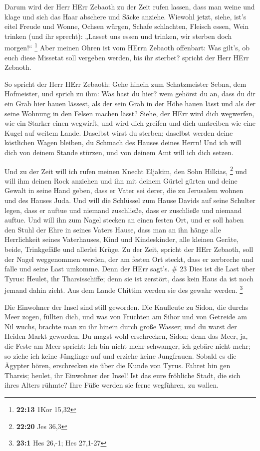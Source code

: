  Darum wird der Herr HErr Zebaoth zu der Zeit rufen lassen,
dass man weine und klage und sich das Haar abschere und Säcke anziehe.
 Wiewohl jetzt, siehe, ist's eitel Freude und Wonne, Ochsen
würgen, Schafe schlachten, Fleisch essen, Wein trinken (und ihr
sprecht): „Lasset uns essen und trinken, wir sterben doch morgen!{}``
\footnote{\textbf{22:13} 1Kor 15,32}  Aber meinen Ohren ist
vom HErrn Zebaoth offenbart: Was gilt's, ob euch diese Missetat soll
vergeben werden, bis ihr sterbet? spricht der Herr HErr Zebaoth.

 So spricht der Herr HErr Zebaoth: Gehe hinein zum
Schatzmeister Sebna, dem Hofmeister, und sprich zu ihm: 
Was hast du hier? wem gehörst du an, dass du dir ein Grab hier hauen
lässest, als der sein Grab in der Höhe hauen lässt und als der seine
Wohnung in den Felsen machen lässt?  Siehe, der HErr wird
dich wegwerfen, wie ein Starker einen wegwirft, und wird dich greifen
 und dich umtreiben wie eine Kugel auf weitem Lande.
Daselbst wirst du sterben; daselbst werden deine köstlichen Wagen
bleiben, du Schmach des Hauses deines Herrn!  Und ich will
dich von deinem Stande stürzen, und von deinem Amt will ich dich setzen.

 Und zu der Zeit will ich rufen meinen Knecht Eljakim, den
Sohn Hilkias, \footnote{\textbf{22:20} Jes 36,3}  und will
ihm deinen Rock anziehen und ihn mit deinem Gürtel gürten und deine
Gewalt in seine Hand geben, dass er Vater sei derer, die zu Jerusalem
wohnen und des Hauses Juda.  Und will die Schlüssel zum
Hause Davids auf seine Schulter legen, dass er auftue und niemand
zuschließe, dass er zuschließe und niemand auftue.  Und
will ihn zum Nagel stecken an einen festen Ort, und er soll haben den
Stuhl der Ehre in seines Vaters Hause,  dass man an ihn
hänge alle Herrlichkeit seines Vaterhauses, Kind und Kindeskinder, alle
kleinen Geräte, beide, Trinkgefäße und allerlei Krüge.  Zu
der Zeit, spricht der HErr Zebaoth, soll der Nagel weggenommen werden,
der am festen Ort steckt, dass er zerbreche und falle und seine Last
umkomme. Denn der HErr sagt's. \# 23  Dies ist die Last über
Tyrus: Heulet, ihr Tharsisschiffe; denn sie ist zerstört, dass kein Haus
da ist noch jemand dahin zieht. Aus dem Lande Chittim werden sie des
gewahr werden. \footnote{\textbf{23:1} Hes 26,-1; Hes 27,1-27}

 Die Einwohner der Insel sind still geworden. Die Kaufleute
zu Sidon, die durchs Meer zogen, füllten dich,  und was von
Früchten am Sihor und von Getreide am Nil wuchs, brachte man zu ihr
hinein durch große Wasser; und du warst der Heiden Markt geworden.
 Du magst wohl erschrecken, Sidon; denn das Meer, ja, die
Feste am Meer spricht: Ich bin nicht mehr schwanger, ich gebäre nicht
mehr; so ziehe ich keine Jünglinge auf und erziehe keine Jungfrauen.
 Sobald es die Ägypter hören, erschrecken sie über die Kunde
von Tyrus.  Fahret hin gen Tharsis; heulet, ihr Einwohner
der Insel!  Ist das eure fröhliche Stadt, die sich ihres
Alters rühmte? Ihre Füße werden sie ferne wegführen, zu wallen.

